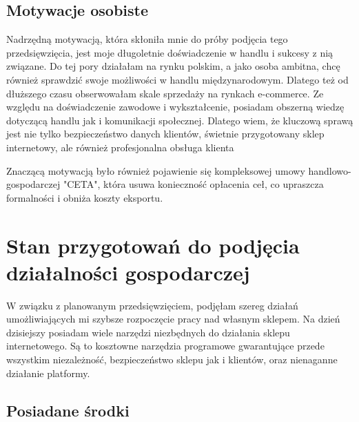 		\subsection{Motywacje osobiste}
			\par Nadrzędną motywacją, która skłoniła mnie do próby podjęcia tego przedsięwzięcia, jest moje długoletnie doświadczenie w handlu i sukcesy z nią związane. Do tej pory działałam na rynku polskim, a jako osoba ambitna, chcę również sprawdzić swoje możliwości w handlu międzynarodowym. Dlatego też od dłuższego czasu obserwowałam skale sprzedaży na rynkach e-commerce. Ze względu na doświadczenie zawodowe i wykształcenie, posiadam obszerną wiedzę dotyczącą handlu jak i komunikacji społecznej. Dlatego wiem, że kluczową sprawą jest nie tylko bezpieczeństwo danych klientów, świetnie przygotowany sklep internetowy, ale również profesjonalna obsługa klienta
			\par Znaczącą motywacją było również pojawienie się kompleksowej umowy handlowo-gospodarczej "CETA", która usuwa konieczność opłacenia ceł, co upraszcza formalności i obniża koszty eksportu. 

	\section{Stan przygotowań do podjęcia działalności gospodarczej}
		\par W związku z planowanym przedsięwzięciem, podjęłam szereg działań umożliwiających mi szybsze rozpoczęcie pracy nad własnym sklepem. Na dzień dzisiejszy posiadam wiele narzędzi niezbędnych do działania sklepu internetowego. Są to kosztowne narzędzia programowe gwarantujące przede wszystkim niezależność, bezpieczeństwo sklepu jak i klientów, oraz nienaganne działanie platformy.

		\subsection{Posiadane środki}
